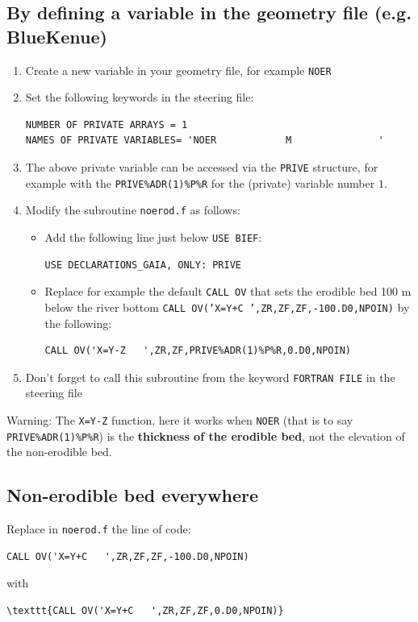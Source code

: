{\subsection{By defining a variable in the geometry file (e.g. BlueKenue)}
\begin{enumerate}
\item Create a new variable in your geometry file, for example \texttt{NOER}
\item Set the following keywords in the \gaia steering file:
\begin{lstlisting}[frame=trBL]
NUMBER OF PRIVATE ARRAYS = 1
NAMES OF PRIVATE VARIABLES= 'NOER            M               '
\end{lstlisting}
\item The above private variable can be accessed via the \texttt{PRIVE} structure, for example with the \texttt{PRIVE\%ADR(1)\%P\%R} for the (private) variable number $1$.
\item Modify the subroutine \texttt{noerod.f} as follows:
  \begin{itemize}
    \item Add the following line just below \texttt{USE BIEF}:
      \begin{lstlisting}[frame=trBL]
        USE DECLARATIONS_GAIA, ONLY: PRIVE
      \end{lstlisting}
    \item Replace for example the default \texttt{CALL OV} that sets the erodible bed 100 m below the river bottom \texttt{CALL OV('X=Y+C   ',ZR,ZF,ZF,-100.D0,NPOIN)} by the following:
      \begin{lstlisting}[frame=trBL]
       CALL OV('X=Y-Z   ',ZR,ZF,PRIVE%ADR(1)%P%R,0.D0,NPOIN)
      \end{lstlisting}
  \end{itemize}
\item Don't forget to call this subroutine from the keyword \texttt{FORTRAN FILE} in the steering file
\end{enumerate}

 \begin{WarningBlock}{Warning:}
The \texttt{X=Y-Z} function, here it works when \texttt{NOER} (that is to say \texttt{PRIVE\%ADR(1)\%P\%R}) is the \textbf{thickness of the erodible bed}, not the elevation of the non-erodible bed.
 \end{WarningBlock}

 \subsection{Non-erodible bed everywhere}
Replace in \texttt{noerod.f} the line of code:
\begin{lstlisting}[frame=trBL]
  CALL OV('X=Y+C   ',ZR,ZF,ZF,-100.D0,NPOIN)
\end{lstlisting}
with
\begin{lstlisting}[frame=trBL]
\texttt{CALL OV('X=Y+C   ',ZR,ZF,ZF,0.D0,NPOIN)}
\end{lstlisting}


}
